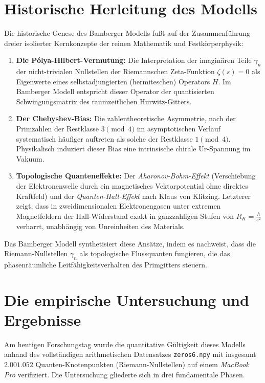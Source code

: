\documentclass[11pt,a4paper]{article}
\begin{document}
\section{Historische Herleitung des Modells}
Die historische Genese des Bamberger Modells fußt auf der Zusammenführung dreier isolierter Kernkonzepte der reinen Mathematik und Festkörperphysik:
\begin{enumerate}
    \item \textbf{Die Pólya-Hilbert-Vermutung:} Die Interpretation der imaginären Teile $\gamma_n$ der nicht-trivialen Nullstellen der Riemannschen Zeta-Funktion $\zeta(s) = 0$ als Eigenwerte eines selbstadjungierten (hermiteschen) Operators $H$. Im Bamberger Modell entspricht dieser Operator der quantisierten Schwingungsmatrix des raumzeitlichen Hurwitz-Gitters.
    \item \textbf{Der Chebyshev-Bias:} Die zahlentheoretische Asymmetrie, nach der Primzahlen der Restklasse $3 \pmod 4$ im asymptotischen Verlauf systematisch häufiger auftreten als solche der Restklasse $1 \pmod 4$. Physikalisch induziert dieser Bias eine intrinsische chirale Ur-Spannung im Vakuum.
    \item \textbf{Topologische Quanteneffekte:} Der \textit{Aharonov-Bohm-Effekt} (Verschiebung der Elektronenwelle durch ein magnetisches Vektorpotential ohne direktes Kraftfeld) und der \textit{Quanten-Hall-Effekt} nach Klaus von Klitzing. Letzterer zeigt, dass in zweidimensionalen Elektronengasen unter extremen Magnetfeldern der Hall-Widerstand exakt in ganzzahligen Stufen von $R_K = \frac{h}{e^2}$ verharrt, unabhängig von Unreinheiten des Materials.
\end{enumerate}
Das Bamberger Modell synthetisiert diese Ansätze, indem es nachweist, dass die Riemann-Nullstellen $\gamma_n$ als topologische Flussquanten fungieren, die das phasenräumliche Leitfähigkeitsverhalten des Primgitters steuern.

\section{Die empirische Untersuchung und Ergebnisse}
Am heutigen Forschungstag wurde die quantitative Gültigkeit dieses Modells anhand des vollständigen arithmetischen Datensatzes \texttt{zeros6.npy} mit insgesamt $2.001.052$ Quanten-Knotenpunkten (Riemann-Nullstellen) auf einem \textit{MacBook Pro} verifiziert. Die Untersuchung gliederte sich in drei fundamentale Phasen.
\end{document}
